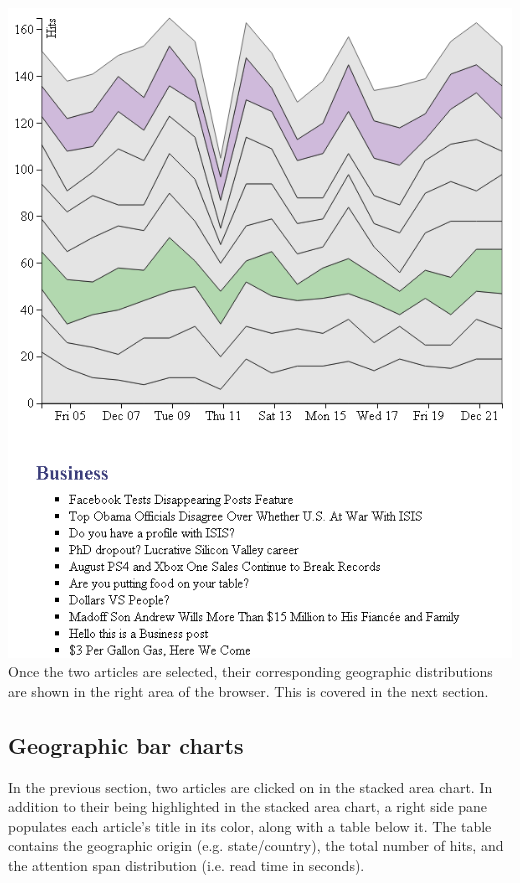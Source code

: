 \documentclass[12pt]{article}
\begin{document}
\noindent\includegraphics[scale=0.8]{img/viz_7} \\

\noindent Once the two articles are selected, their corresponding geographic distributions are shown in the right area of the browser. This is covered in the next section. 

\newpage

\subsection{Geographic bar charts}

In the previous section, two articles are clicked on in the stacked area chart. In addition to their being highlighted in the stacked area chart, a right side pane populates each article's title in its color, along with a table below it. The table contains the geographic origin (e.g. state/country), the total number of hits, and the attention span distribution (i.e. read time in seconds).\\
\end{document}
